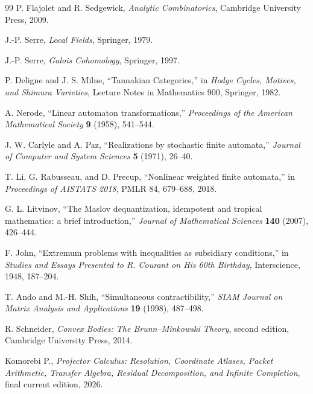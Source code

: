 \documentclass[11pt]{article}
\theoremstyle{definition}
\theoremstyle{remark}
\begin{document}
\begin{thebibliography}{99}
P. Flajolet and R. Sedgewick, \emph{Analytic Combinatorics}, Cambridge University Press, 2009.

J.-P. Serre, \emph{Local Fields}, Springer, 1979.

J.-P. Serre, \emph{Galois Cohomology}, Springer, 1997.

P. Deligne and J. S. Milne, ``Tannakian Categories,'' in \emph{Hodge Cycles, Motives, and Shimura Varieties}, Lecture Notes in Mathematics 900, Springer, 1982.


A. Nerode, ``Linear automaton transformations,'' \emph{Proceedings of the American Mathematical Society} \textbf{9} (1958), 541--544.

J. W. Carlyle and A. Paz, ``Realizations by stochastic finite automata,'' \emph{Journal of Computer and System Sciences} \textbf{5} (1971), 26--40.

T. Li, G. Rabusseau, and D. Precup, ``Nonlinear weighted finite automata,'' in \emph{Proceedings of AISTATS 2018}, PMLR 84, 679--688, 2018.

G. L. Litvinov, ``The Maslov dequantization, idempotent and tropical mathematics: a brief introduction,'' \emph{Journal of Mathematical Sciences} \textbf{140} (2007), 426--444.

F. John, ``Extremum problems with inequalities as subsidiary conditions,'' in \emph{Studies and Essays Presented to R. Courant on His 60th Birthday}, Interscience, 1948, 187--204.

T. Ando and M.-H. Shih, ``Simultaneous contractibility,'' \emph{SIAM Journal on Matrix Analysis and Applications} \textbf{19} (1998), 487--498.

R. Schneider, \emph{Convex Bodies: The Brunn--Minkowski Theory}, second edition, Cambridge University Press, 2014.

Komorebi P., \emph{Projector Calculus: Resolution, Coordinate Atlases, Packet Arithmetic, Transfer Algebra, Residual Decomposition, and Infinite Completion}, final current edition, 2026.

\end{thebibliography}
\end{document}
